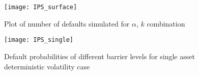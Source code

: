 \begin{figure}
	\centering
	\texttt{[image: IPS\_surface]}
	\caption{Plot of number of defaults simulated for $\alpha$, $k$ combination}
	\label{fig:IPS_surface}
\end{figure}

\begin{figure}
	\centering
	\texttt{[image: IPS\_single]}
	\caption{Default probabilities of different barrier levels for single asset
	deterministic volatility case}
	\label{fig:IPS_single}
\end{figure}
